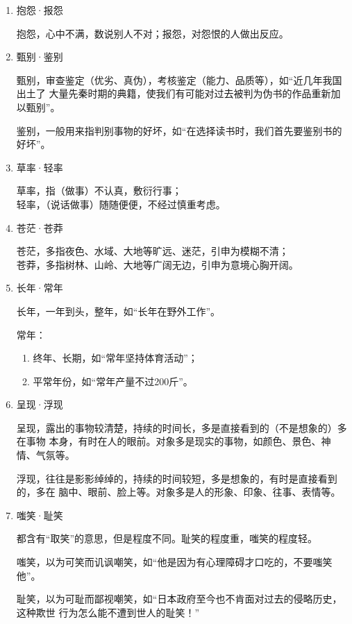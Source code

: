 \documentclass[final,oneside]{ctexbook}
\begin{document}
\begin{enumerate}
  \item 抱怨·报怨

    抱怨，心中不满，数说别人不对；报怨，对怨恨的人做出反应。

  \item 甄别·鉴别

    甄别，审查鉴定（优劣、真伪），考核鉴定（能力、品质等），如“近几年我国出土了
    大量先秦时期的典籍，使我们有可能对过去被判为伪书的作品重新加以甄别”。

    鉴别，一般用来指判别事物的好坏，如“在选择读书时，我们首先要鉴别书的好坏”。

  \item 草率·轻率

    草率，指（做事）不认真，敷衍行事；\\
    轻率，（说话做事）随随便便，不经过慎重考虑。

  \item 苍茫·苍莽

    苍茫，多指夜色、水域、大地等旷远、迷茫，引申为模糊不清；\\
    苍莽，多指树林、山岭、大地等广阔无边，引申为意境心胸开阔。

  \item 长年·常年

    长年，一年到头，整年，如“长年在野外工作”。

    常年：

    \begin{enumerate}
      \item 终年、长期，如“常年坚持体育活动”；
      \item 平常年份，如“常年产量不过200斤”。
    \end{enumerate}

  \item 呈现·浮现

    呈现，露出的事物较清楚，持续的时间长，多是直接看到的（不是想象的）多在事物
    本身，有时在人的眼前。对象多是现实的事物，如颜色、景色、神情、气氛等。

    浮现，往往是影影绰绰的，持续的时间较短，多是想象的，有时是直接看到的，多在
    脑中、眼前、脸上等。对象多是人的形象、印象、往事、表情等。

  \item 嗤笑·耻笑

    都含有“取笑”的意思，但是程度不同。耻笑的程度重，嗤笑的程度轻。

    嗤笑，以为可笑而讥讽嘲笑，如“他是因为有心理障碍才口吃的，不要嗤笑他”。

    耻笑，以为可耻而鄙视嘲笑，如“日本政府至今也不肯面对过去的侵略历史，这种欺世
    行为怎么能不遭到世人的耻笑！”

\end{enumerate}
\end{document}
